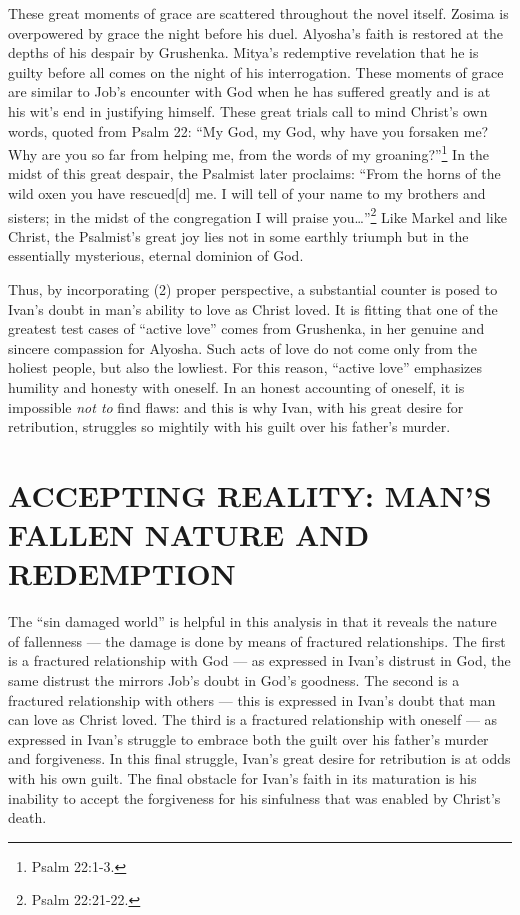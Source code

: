 These great moments of grace are scattered throughout the novel itself. Zosima is overpowered by grace the night before his duel. Alyosha's faith is restored at the depths of his despair by Grushenka. Mitya's redemptive revelation that he is guilty before all comes on the night of his interrogation. These moments of grace are similar to Job's encounter with God when he has suffered greatly and is at his wit's end in justifying himself. These great trials call to mind Christ's own words, quoted from Psalm 22: ``My God, my God, why have you forsaken me? Why are you so far from helping me, from the words of my groaning?''\footnote{Psalm 22:1-3.} In the midst of this great despair, the Psalmist later proclaims: ``From the horns of the wild oxen you have rescued[d] me. I will tell of your name to my brothers and sisters; in the midst of the congregation I will praise you\ldots''\footnote{Psalm 22:21-22.} Like Markel and like Christ, the Psalmist's great joy lies not in some earthly triumph but in the essentially mysterious, eternal dominion of God. 

Thus, by incorporating (2) proper perspective, a substantial counter is posed to Ivan's doubt in man's ability to love as Christ loved. It is fitting that one of the greatest test cases of ``active love'' comes from Grushenka, in her genuine and sincere compassion for Alyosha. Such acts of love do not come only from the holiest people, but also the lowliest. For this reason, ``active love'' emphasizes humility and honesty with oneself. In an honest accounting of oneself, it is impossible \emph{not to} find flaws: and this is why Ivan, with his great desire for retribution, struggles so mightily with his guilt over his father's murder.

\chapter{ACCEPTING REALITY: MAN'S FALLEN NATURE AND REDEMPTION}
The ``sin damaged world'' is helpful in this analysis in that it reveals the nature of fallenness --- the damage is done by means of fractured relationships. The first is a fractured relationship with God --- as expressed in Ivan's distrust in God, the same distrust the mirrors Job's doubt in God's goodness. The second is a fractured relationship with others --- this is expressed in Ivan's doubt that man can love as Christ loved. The third is a fractured relationship with oneself --- as expressed in Ivan's struggle to embrace both the guilt over his father's murder and forgiveness. In this final struggle, Ivan's great desire for retribution is at odds with his own guilt. The final obstacle for Ivan's faith in its maturation is his inability to accept the forgiveness for his sinfulness that was enabled by Christ's death.

